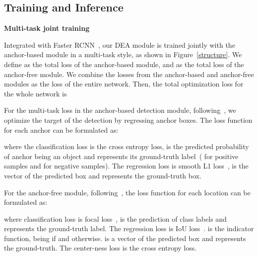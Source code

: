 \documentclass[journal]{IEEEtran}
\newcommand{\myparagraph}[1]{\vspace{0.1em}\noindent\textbf{#1}}
\begin{document}
\subsection{Training and Inference}\label{sec3.3}
\myparagraph{Multi-task joint training} 

Integrated with Faster RCNN~\cite{ren2016faster}, our DEA module is trained jointly with the anchor-based module in a multi-task style, as shown in Figure~\ref{structure}. We define  as the total loss of the anchor-based module, and  as the total loss of the anchor-free module. We combine the losses from the anchor-based and anchor-free modules as the loss of the entire network. Then, the total optimization loss for the whole network is 



For the multi-task loss in the anchor-based detection module, following~\cite{ren2016faster}, we optimize the target of the detection by regressing anchor boxes. The loss function for each anchor can be formulated as:

where the classification loss  is the cross entropy loss,  is the predicted probability of anchor  being an object and  represents its ground-truth label~( for positive samples and  for negative samples). The regression loss  is smooth L1 loss~\cite{girshick2015fast},  is the vector of the predicted box and  represents the ground-truth box.

For the anchor-free module, following~\cite{tian2019fcos}, the loss function for each location can be formulated as:

where classification loss  is focal loss~\cite{lin2017focal},  is the prediction of class labels and  represents the ground-truth label. The regression loss  is IoU loss~\cite{yu2016unitbox}.  is the indicator function, being  if  and  otherwise.  is a vector of the predicted box and  represents the ground-truth. The center-ness loss  is the cross entropy loss.
\end{document}
